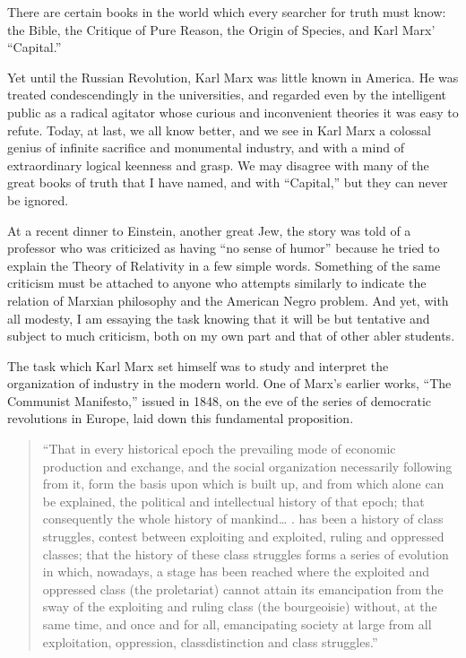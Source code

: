 \documentclass[letterpaper,10pt,english]{jupyterBook}
\begin{document}
\sphinxAtStartPar
There are certain books in the world which every searcher for truth must know: the Bible, the Critique of Pure Reason, the Origin of Species, and Karl Marx’ “Capital.”

\sphinxAtStartPar
Yet until the Russian Revolution, Karl Marx was little known in America. He was treated condescendingly in the universities, and regarded even by the intelligent public as a radical agitator whose curious and inconvenient theories it was easy to refute. Today, at last, we all know better, and we see in Karl Marx a colossal genius of infinite sacrifice and monumental industry, and with a mind of extraordinary logical keenness and grasp. We may disagree with many of the great books of truth that I have named, and with “Capital,” but they can never be ignored.

\sphinxAtStartPar
At a recent dinner to Einstein, another great Jew, the story was told of a professor who was criticized as having “no sense of humor” because he tried to explain the Theory of Relativity in a few simple words. Something of the same criticism must be attached to anyone who attempts similarly to indicate the relation of Marxian philosophy and the American Negro problem. And yet, with all modesty, I am essaying the task knowing that it will be but tentative and subject to much criticism, both on my own part and that of other abler students.

\sphinxAtStartPar
The task which Karl Marx set himself was to study and interpret the organization of industry in the modern world. One of Marx’s earlier works, “The Communist Manifesto,” issued in 1848, on the eve of the series of democratic revolutions in Europe, laid down this fundamental proposition.
\begin{quote}

\sphinxAtStartPar
“That in every historical epoch the prevailing mode of economic production and exchange, and the social organization necessarily following from it, form the basis upon which is built up, and from which alone can be explained, the political and intellectual history of that epoch; that consequently the whole history of mankind… . has been a history of class struggles, contest between exploiting and exploited, ruling and oppressed classes; that the history of these class struggles forms a series of evolution in which, now\sphinxhyphen{}a\sphinxhyphen{}days, a stage has been reached where the exploited and oppressed class (the proletariat) cannot attain its emancipation from the sway of the exploiting and ruling class (the bourgeoisie) without, at the same time, and once and for all, emancipating society at large from all exploitation, oppression, class\sphinxhyphen{}distinction and class struggles.”
\end{quote}
\end{document}

